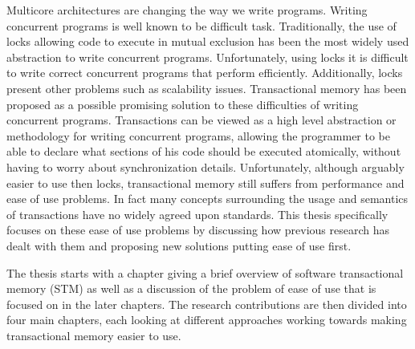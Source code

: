 \documentclass[11pt]{book}
\begin{document}
Multicore architectures are changing the way we write programs.
Writing concurrent programs is well known to be difficult task.
Traditionally, the use of locks allowing code to execute in mutual exclusion
has been the most widely used abstraction to write concurrent programs.
Unfortunately, using locks it is
difficult to write correct concurrent programs that perform efficiently.
Additionally, locks present other problems such as scalability issues.
Transactional memory has been proposed as a possible promising solution to these difficulties of writing concurrent programs.
Transactions can be viewed as a high level abstraction or methodology for writing concurrent programs, allowing
the programmer to be able to declare what sections of his code should be executed atomically,
without having to worry about synchronization details.
Unfortunately, although arguably easier to use then locks, transactional memory still suffers from performance and ease of use problems.
In fact many concepts surrounding the usage and semantics of transactions have
no widely agreed upon standards.
This thesis specifically focuses on
these ease of use problems by discussing how previous research has dealt with them
and proposing new solutions putting ease of use first.


The thesis starts with a chapter giving a brief overview of software transactional
memory (STM) as well as a discussion of the problem of ease of use that is focused on in the later chapters.
The research contributions are then divided into four main chapters, each looking at different approaches
working towards making transactional memory easier to use.





\end{document}
